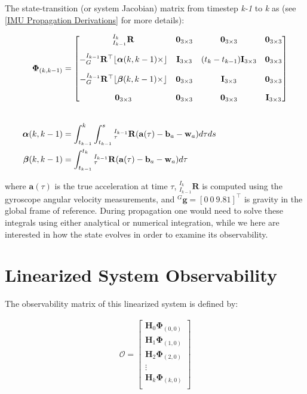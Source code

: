 The state-\/transition (or system Jacobian) matrix from timestep {\itshape k-\/1} to {\itshape k} as (see \mbox{[}\hyperlink{propagation}{I\+MU Propagation Derivations}\mbox{]} for more details)\+:

\begin{align*} \mathbf{\Phi}_{(k,k-1)}&= \begin{bmatrix} {}^{I_{k}}_{I_{k-1}}\mathbf R & \mathbf 0_{3\times3} & \mathbf 0_{3\times3} & \mathbf 0_{3\times3} \\[1em] \empty -{}^{I_{k-1}}_{G}\mathbf{R}^\top \lfloor \boldsymbol\alpha(k,k-1) \times\rfloor & \mathbf I_{3\times3} & (t_{k}-t_{k-1})\mathbf I_{3\times3} & \mathbf 0_{3\times3} \\[1em] \empty -{}^{I_{k-1}}_{G}\mathbf{R}^\top \lfloor \boldsymbol\beta(k,k-1) \times\rfloor & \mathbf 0_{3\times3} & \mathbf I_{3\times3} & \mathbf 0_{3\times3} \\[1em] \empty \mathbf 0_{3\times3} & \mathbf 0_{3\times3} & \mathbf 0_{3\times3} & \mathbf I_{3\times3} \end{bmatrix} \\[2em] \boldsymbol\alpha(k,k-1) &= \int_{t_{k-1}}^{k} \int_{t_{k-1}}^{s} {}^{I_{k-1}}_{\tau}\mathbf R (\mathbf a(\tau)-\mathbf b_a - \mathbf w_a) d\tau ds \\ \boldsymbol\beta(k,k-1) &= \int_{t_{k-1}}^{t_k} {}^{I_{k-1}}_{\tau}\mathbf R (\mathbf a(\tau)-\mathbf b_a - \mathbf w_a) d\tau \end{align*}

where $\mathbf a(\tau)$ is the true acceleration at time $\tau $, ${}^{I_{k}}_{I_{k-1}}\mathbf R$ is computed using the gyroscope angular velocity measurements, and ${}^{G}\mathbf g = [0 ~ 0 ~ 9.81]^\top$ is gravity in the global frame of reference. During propagation one would need to solve these integrals using either analytical or numerical integration, while we here are interested in how the state evolves in order to examine its observability.\hypertarget{fej_fej-sys-observability}{}\section{Linearized System Observability}\label{fej_fej-sys-observability}
The observability matrix of this linearized system is defined by\+:

\begin{align*} \mathcal{O}= \begin{bmatrix} \mathbf{H}_{0}\mathbf{\Phi}_{(0,0)} \\ \mathbf{H}_{1}\mathbf{\Phi}_{(1,0)} \\ \mathbf{H}_{2}\mathbf{\Phi}_{(2,0)} \\ \vdots \\ \mathbf{H}_{k}\mathbf{\Phi}_{(k,0)} \\ \end{bmatrix} \end{align*}

